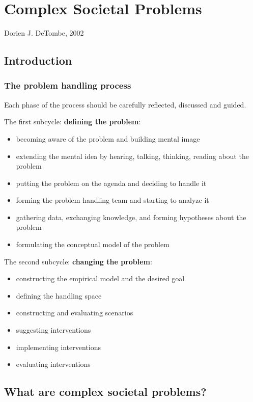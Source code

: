 \section{Complex Societal Problems}

Dorien J. DeTombe, 2002

\subsection{Introduction}

\subsubsection{The problem handling process}

Each phase of the process should be carefully reflected, discussed and guided.

The first subcycle: \textbf{defining the problem}:

\begin{itemize}
	\item becoming aware of the problem and building mental image
	\item extending the mental idea by hearing, talking, thinking, reading
	about the problem
	\item putting the problem on the agenda and deciding to handle it
	\item forming the problem handling team and starting to analyze it
	\item gathering data, exchanging knowledge, and forming hypotheses
	about the problem
	\item formulating the conceptual model of the problem
\end{itemize}

The second subcycle: \textbf{changing the problem}:

\begin{itemize}
	\item constructing the empirical model and the desired goal
	\item defining the handling space
	\item constructing and evaluating scenarios
	\item suggesting interventions
	\item implementing interventions
	\item evaluating interventions
\end{itemize}

\subsection{What are complex societal problems?}

